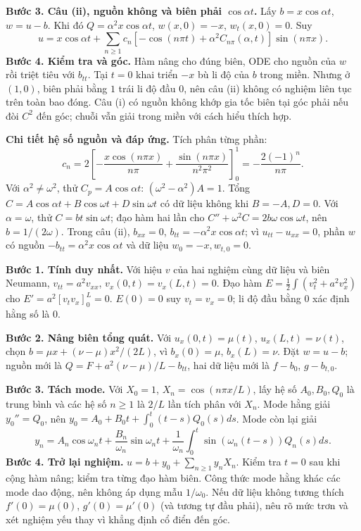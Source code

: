 \textbf{Bước 3. Câu (ii), nguồn không và biên phải $\cos\alpha t$.} Lấy $b=x\cos\alpha t$, $w=u-b$. Khi đó $Q=\alpha^2x\cos\alpha t$, $w(x,0)=-x$, $w_t(x,0)=0$. Suy
\[u=x\cos\alpha t+\sum_{n\ge1}c_n[-\cos(n\pi t)+\alpha^2C_{n\pi}(\alpha,t)]\sin(n\pi x).\]
\textbf{Bước 4. Kiểm tra và góc.} Hàm nâng cho đúng biên, ODE cho nguồn của $w$ rồi triệt tiêu với $b_{tt}$. Tại $t=0$ khai triển $-x$ bù li độ của $b$ trong miền. Nhưng ở $(1,0)$, biên phải bằng $1$ trái li độ đầu $0$, nên câu (ii) không có nghiệm liên tục trên toàn bao đóng. Câu (i) có nguồn không khớp gia tốc biên tại góc phải nếu đòi $C^2$ đến góc; chuỗi vẫn giải trong miền với cách hiểu thích hợp.

\textbf{Chi tiết hệ số nguồn và đáp ứng.} Tích phân từng phần:
\[c_n=2\left[-\frac{x\cos(n\pi x)}{n\pi}+
\frac{\sin(n\pi x)}{n^2\pi^2}\right]_0^1
=-\frac{2(-1)^n}{n\pi}.\]
Với $\alpha^2\ne\omega^2$, thử $C_p=A\cos\alpha t$: $(\omega^2-\alpha^2)A=1$. Tổng $C=A\cos\alpha t+B\cos\omega t+D\sin\omega t$ có dữ liệu không khi $B=-A,D=0$. Với $\alpha=\omega$, thử $C=bt\sin\omega t$; đạo hàm hai lần cho $C''+\omega^2C=2b\omega\cos\omega t$, nên $b=1/(2\omega)$. Trong câu (ii), $b_{xx}=0$, $b_{tt}=-\alpha^2x\cos\alpha t$; vì $u_{tt}-u_{xx}=0$, phần $w$ có nguồn $-b_{tt}=\alpha^2x\cos\alpha t$ và dữ liệu $w_0=-x,w_{t,0}=0$.

\textbf{Bước 1. Tính duy nhất.} Với hiệu $v$ của hai nghiệm cùng dữ liệu và biên Neumann, $v_{tt}=a^2v_{xx}$, $v_x(0,t)=v_x(L,t)=0$. Đạo hàm $E=\frac12\int(v_t^2+a^2v_x^2)$ cho $E'=a^2[v_tv_x]_0^L=0$. $E(0)=0$ suy $v_t=v_x=0$; li độ đầu bằng $0$ xác định hằng số là $0$.

\textbf{Bước 2. Nâng biên tổng quát.} Với $u_x(0,t)=\mu(t)$, $u_x(L,t)=\nu(t)$, chọn $b=\mu x+(\nu-\mu)x^2/(2L)$, vì $b_x(0)=\mu$, $b_x(L)=\nu$. Đặt $w=u-b$; nguồn mới là $Q=F+a^2(\nu-\mu)/L-b_{tt}$, hai dữ liệu mới là $f-b_0$, $g-b_{t,0}$.

\textbf{Bước 3. Tách mode.} Với $X_0=1$, $X_n=\cos(n\pi x/L)$, lấy hệ số $A_0,B_0,Q_0$ là trung bình và các hệ số $n\ge1$ là $2/L$ lần tích phân với $X_n$. Mode hằng giải $y_0''=Q_0$, nên $y_0=A_0+B_0t+\int_0^t(t-s)Q_0(s)ds$. Mode còn lại giải
\[y_n=A_n\cos\omega_nt+\frac{B_n}{\omega_n}\sin\omega_nt+\frac1{\omega_n}\int_0^t\sin(\omega_n(t-s))Q_n(s)ds.\]
\textbf{Bước 4. Trở lại nghiệm.} $u=b+y_0+\sum_{n\ge1}y_nX_n$. Kiểm tra $t=0$ sau khi cộng hàm nâng; kiểm tra từng đạo hàm biên. Công thức mode hằng khác các mode dao động, nên không áp dụng mẫu $1/\omega_0$. Nếu dữ liệu không tương thích $f'(0)=\mu(0)$, $g'(0)=\mu'(0)$ (và tương tự đầu phải), nêu rõ mức trơn và xét nghiệm yếu thay vì khẳng định cổ điển đến góc.

